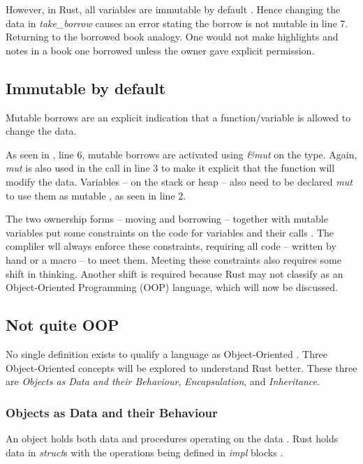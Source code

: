 However, in Rust, all variables are immutable by default \cite{klabnik_2019_01}.
Hence changing the data in \textit{take\_borrow} causes an error stating the borrow is not mutable in line 7.
Returning to the borrowed book analogy.
One would not make highlights and notes in a book one borrowed unless the owner gave explicit permission.

\subsection{Immutable by default}
Mutable borrows are an explicit indication that a function/variable is allowed to change the data.


As seen in , line 6, mutable borrows are activated using \textit{\&mut } on the type.
Again, \textit{mut} is also used in the call in line 3 to make it explicit that the function will modify the data.
Variables -- on the stack or heap -- also need to be declared \textit{mut} to use them as mutable \cite{klabnik_2019_01}, as seen in line 2.

The two ownership forms -- moving and borrowing -- together with mutable variables put some constraints on the code for variables and their calls \cite{klabnik_2019_01}.
The compliler wll always enforce these constraints, requiring all code -- written by hand or a macro -- to meet them.
Meeting these constraints also requires some shift in thinking.
Another shift is required because Rust may not classify as an Object-Oriented Programming (OOP) language, which will now be discussed.

\subsection{Not quite OOP}
No single definition exists to qualify a language as Object-Oriented \cite{meyer_97_01,stefik_85_01,gamma_94_01,klabnik_2019_01}.
Three Object-Oriented concepts will be explored to understand Rust better.
These three are \textit{Objects as Data and their Behaviour}, \textit{Encapsulation}, and \textit{Inheritance}.

\subsubsection{Objects as Data and their Behaviour}
An object holds both data and procedures operating on the data \cite{meyer_97_01,stefik_85_01,gamma_94_01,malik_09_01}.
Rust holds data in \textit{struct}s with the operations being defined in \textit{impl} blocks \cite{klabnik_2019_01}.

